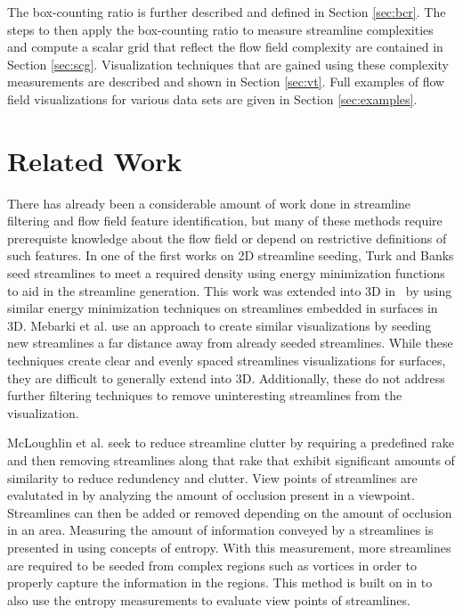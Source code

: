 \documentclass{egpubl}
\begin{document}
The box-counting ratio is further described and defined in Section \ref{sec:bcr}.
The steps to then apply the box-counting ratio to measure streamline complexities and compute a scalar grid that reflect the flow field complexity are contained in Section \ref{sec:scg}.
Visualization techniques that are gained using these complexity measurements are described and shown in Section \ref{sec:vt}.
Full examples of flow field visualizations for various data sets are given in Section \ref{sec:examples}.

\section{Related Work}

There has already been a considerable amount of work done in streamline filtering and flow field feature identification, but many of these methods require prerequiste knowledge about the flow field or depend on restrictive definitions of such features.
In one of the first works on 2D streamline seeding, Turk and Banks \cite{turk} seed streamlines to meet a required density using energy minimization functions to aid in the streamline generation.
This work was extended into 3D in~\cite{mao} by using similar energy minimization techniques on streamlines embedded in surfaces in 3D.
Mebarki et al. \cite{mebarki} use an approach to create similar visualizations by seeding new streamlines a far distance away from already seeded streamlines.
While these techniques create clear and evenly spaced streamlines visualizations for surfaces, they are difficult to generally extend into 3D.
Additionally, these do not address further filtering techniques to remove uninteresting streamlines from the visualization.

McLoughlin et al. \cite{mcloughlin} seek to reduce streamline clutter by requiring a predefined rake and then removing streamlines along that rake that exhibit significant amounts of similarity to reduce redundency and clutter.
View points of streamlines are evalutated in \cite{marchesin} by analyzing the amount of occlusion present in a viewpoint.
Streamlines can then be added or removed depending on the amount of occlusion in an area.
Measuring the amount of information conveyed by a streamlines is presented in \cite{shen} using concepts of entropy.
With this measurement, more streamlines are required to be seeded from complex regions such as vortices in order to properly capture the information in the regions.
This method is built on in \cite{lee} to also use the entropy measurements to evaluate view points of streamlines.
\end{document}

